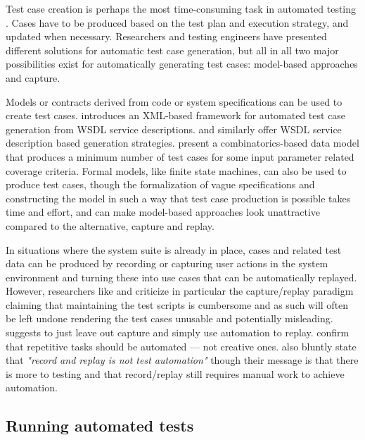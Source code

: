 \documentclass[12pt,a4paper,oneside,pdftex]{report}
\begin{document}
Test case creation is perhaps the most time-consuming task in automated testing \citep{kit1999integrated}. Cases have to be produced based on the test plan and execution strategy, and updated when necessary. Researchers and testing engineers have presented different solutions for automatic test case generation, but all in all two major possibilities exist for automatically generating test cases: model-based approaches and capture.

Models or contracts derived from code or system specifications can be used to create test cases. \citet{tsai2002coyote} introduces an XML-based framework for automated test case generation from WSDL service descriptions. \citet{bai2005WSDL} and \citet{di2007web} similarly offer WSDL service description based generation strategies. \citet{dalal1999model} present a combinatorics-based data model that produces a minimum number of test cases for some input parameter related coverage criteria. Formal models, like finite state machines, can also be used to produce test cases, though the formalization of vague specifications and constructing the model in such a way that test case production is possible takes time and effort, and can make model-based approaches look unattractive compared to the alternative, capture and replay. 

In situations where the system suite is already in place, cases and related test data can be produced by recording or capturing user actions in the system environment and turning these into use cases that can be automatically replayed. However, researchers like \citet{zallar2001you} and \citet{kit1999integrated} criticize in particular the capture/replay paradigm claiming that maintaining the test scripts is cumbersome and as such will often be left undone rendering the test cases unusable and potentially misleading. \citet{kit1999integrated} suggests to just leave out capture and simply use automation to replay. \citet{pezze2008software} confirm that repetitive tasks should be automated --- not creative ones. \citet{fewster1999software} also bluntly state that \emph{"record and replay is not test automation"} though their message is that there is more to testing and that record/replay still requires manual work to achieve automation. 

\subsection{Running automated tests}
\end{document}
